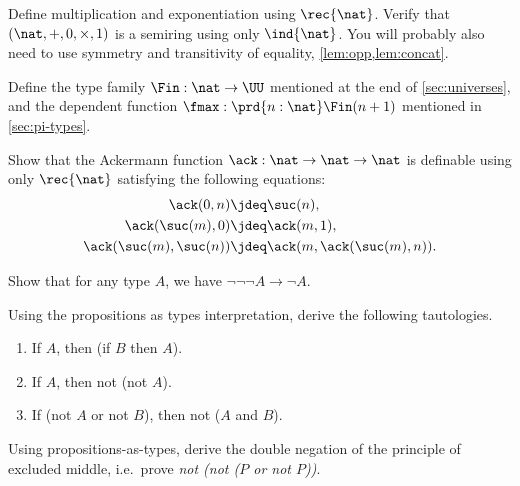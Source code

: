\begin{ex}\label{ex:nat-semiring}
  Define multiplication and exponentiation using $\rec{\nat}$.
  Verify that $(\nat,+,0,\times,1)$ is a semiring using only $\ind{\nat}$.
  You will probably also need to use symmetry and transitivity of equality, \cref{lem:opp,lem:concat}.
\end{ex}

\begin{ex}\label{ex:fin}
  Define the type family $\Fin : \nat \to \UU$ mentioned at the end of \cref{sec:universes}, and the dependent function $\fmax : \prd{n:\nat} \Fin(n+1)$ mentioned in \cref{sec:pi-types}.
\end{ex}

\begin{ex}\label{ex:ackermann}
  Show that the Ackermann function $\ack : \nat \to \nat \to \nat$ is definable using only $\rec{\nat}$ satisfying the following equations:
  \begin{align*}
    \ack(0,n) &\jdeq \suc(n), \\
    \ack(\suc(m),0) &\jdeq \ack(m,1), \\
    \ack(\suc(m),\suc(n)) &\jdeq \ack(m,\ack(\suc(m),n)).
  \end{align*}
\end{ex}

\begin{ex}\label{ex:neg-ldn}
  Show that for any type $A$, we have $\neg\neg\neg A \to \neg A$.
\end{ex}

\begin{ex}\label{ex:tautologies}
  Using the propositions as types interpretation, derive the following tautologies.
  \begin{enumerate}
  \item If $A$, then (if $B$ then $A$).
  \item If $A$, then not (not $A$).
  \item If (not $A$ or not $B$), then not ($A$ and $B$).
  \end{enumerate}
\end{ex}

\begin{ex}\label{ex:not-not-lem}
  Using propositions-as-types, derive the double negation of the principle of excluded middle, i.e.\ prove \emph{not (not ($P$ or not $P$))}.
\end{ex}

